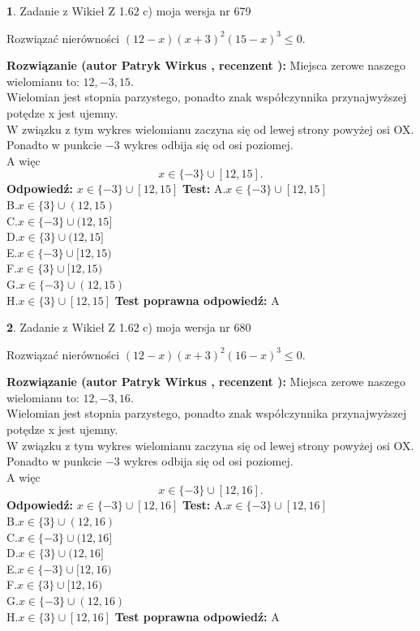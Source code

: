 \documentclass[12pt, a4paper]{article}
\theoremstyle{definition} %
\newtheorem{zad}{}
\newcommand{\zadStart}[1]{\begin{zad}#1\newline}
\newcommand{\zadStop}{\end{zad}}
\newcommand{\rozwStart}[2]{\noindent \textbf{Rozwiązanie (autor #1 , recenzent #2): }\newline}
\newcommand{\rozwStop}{\newline}
\newcommand{\odpStart}{\noindent \textbf{Odpowiedź:}\newline}
\newcommand{\odpStop}{\newline}
\newcommand{\testStart}{\noindent \textbf{Test:}\newline}
\newcommand{\testStop}{\newline}
\newcommand{\kluczStart}{\noindent \textbf{Test poprawna odpowiedź:}\newline}
\newcommand{\kluczStop}{\newline}
\begin{document}
\zadStart{Zadanie z Wikieł Z 1.62 c) moja wersja nr 679}

Rozwiązać nierówności $(12-x)(x+3)^{2}(15-x)^{3}\le0$.
\zadStop
\rozwStart{Patryk Wirkus}{}
Miejsca zerowe naszego wielomianu to: $12, -3, 15$.\\
Wielomian jest stopnia parzystego, ponadto znak współczynnika przy\linebreak najwyższej potędze x jest ujemny.\\ W związku z tym wykres wielomianu zaczyna się od lewej strony powyżej osi OX.\\
Ponadto w punkcie $-3$ wykres odbija się od osi poziomej.\\
A więc $$x \in \{-3\} \cup [12,15].$$
\rozwStop
\odpStart
$x \in \{-3\} \cup [12,15]$
\odpStop
\testStart
A.$x \in \{-3\} \cup [12,15]$\\
B.$x \in \{3\} \cup (12,15)$\\
C.$x \in \{-3\} \cup (12,15]$\\
D.$x \in \{3\} \cup (12,15]$\\
E.$x \in \{-3\} \cup [12,15)$\\
F.$x \in \{3\} \cup [12,15)$\\
G.$x \in \{-3\} \cup (12,15)$\\
H.$x \in \{3\} \cup [12,15]$
\testStop
\kluczStart
A
\kluczStop



\zadStart{Zadanie z Wikieł Z 1.62 c) moja wersja nr 680}

Rozwiązać nierówności $(12-x)(x+3)^{2}(16-x)^{3}\le0$.
\zadStop
\rozwStart{Patryk Wirkus}{}
Miejsca zerowe naszego wielomianu to: $12, -3, 16$.\\
Wielomian jest stopnia parzystego, ponadto znak współczynnika przy\linebreak najwyższej potędze x jest ujemny.\\ W związku z tym wykres wielomianu zaczyna się od lewej strony powyżej osi OX.\\
Ponadto w punkcie $-3$ wykres odbija się od osi poziomej.\\
A więc $$x \in \{-3\} \cup [12,16].$$
\rozwStop
\odpStart
$x \in \{-3\} \cup [12,16]$
\odpStop
\testStart
A.$x \in \{-3\} \cup [12,16]$\\
B.$x \in \{3\} \cup (12,16)$\\
C.$x \in \{-3\} \cup (12,16]$\\
D.$x \in \{3\} \cup (12,16]$\\
E.$x \in \{-3\} \cup [12,16)$\\
F.$x \in \{3\} \cup [12,16)$\\
G.$x \in \{-3\} \cup (12,16)$\\
H.$x \in \{3\} \cup [12,16]$
\testStop
\kluczStart
A
\kluczStop
\end{document}
